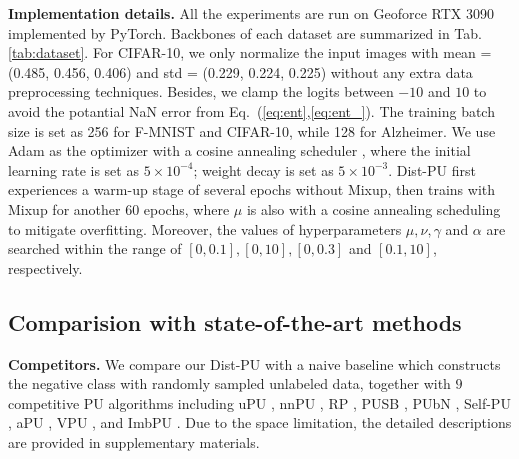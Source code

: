 \documentclass[final]{cvpr}
\newcommand{\bangyan}[1]{#1}
\begin{document}
\textbf{Implementation details.} All the experiments are run on Geoforce RTX 3090 \bangyan{implemented by PyTorch}. Backbones of each dataset are summarized in Tab.\ref{tab:dataset}. For CIFAR-10, we only normalize the input images with mean = (0.485, 0.456, 0.406) and std = (0.229, 0.224, 0.225) \bangyan{without any extra data preprocessing techniques}. Besides, we clamp the logits between $-10$ and $10$ to avoid the potantial NaN error from Eq.~(\ref{eq:ent},\ref{eq:ent_}). The training batch size is set as 256 for F-MNIST and CIFAR-10, while 128 for Alzheimer. We use Adam \cite{DBLP:journals/corr/KingmaB14} as the optimizer with a cosine annealing scheduler \cite{DBLP:conf/iclr/LoshchilovH17}, where the initial learning rate is set as $5\times10^{-4}$; weight decay is set as $5\times 10^{-3}$. Dist-PU first experiences a warm-up stage of several epochs without Mixup, then trains with Mixup for another 60 epochs, where $\mu$ is also with a cosine annealing scheduling to mitigate overfitting. Moreover, the values of hyperparameters $\mu, \nu, \gamma$ and $\alpha$ are searched within the range of $[0, 0.1], [0, 10], [0, 0.3]$ and $[0.1, 10]$, respectively.


\subsection{Comparision with state-of-the-art methods}

\par{\textbf{Competitors.}} We compare our Dist-PU with a naive baseline which constructs the negative class with randomly sampled unlabeled data, together with $9$ competitive PU algorithms including uPU \cite{DBLP:conf/nips/PlessisNS14}, nnPU \cite{DBLP:conf/nips/KiryoNPS17}, {RP}  \cite{northcutt2017rankpruning},  {PUSB}  \cite{DBLP:conf/iclr/KatoTH19},  {PUbN}  \cite{DBLP:conf/icml/HsiehNS19},  {Self-PU}  \cite{DBLP:conf/icml/ChenCCYG0W20},  {aPU} \cite{DBLP:conf/nips/HammoudehL20},  {VPU}  \cite{DBLP:conf/nips/ChenLWZW20}, and  {ImbPU}  \cite{DBLP:conf/ijcai/SuCX21}. Due to the space limitation, the detailed descriptions are provided in supplementary materials. 

    
\end{document}
